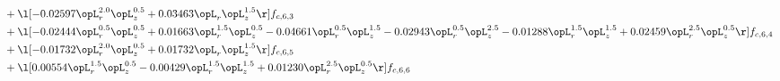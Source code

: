 \begin{alignat}{2}
& + \l[  -0.02597 \opL_r^{2.0} \opL_z^{0.5} +  0.03463 \opL_r \opL_z^{1.5}  \r] f_{c,6,3} \nonumber \\ 
& + \l[  -0.02444 \opL_r^{0.5} \opL_z^{0.5} +  0.01663 \opL_r^{1.5} \opL_z^{0.5}   -0.04661 \opL_r^{0.5} \opL_z^{1.5}   -0.02943 \opL_r^{0.5} \opL_z^{2.5}   -0.01288 \opL_r^{1.5} \opL_z^{1.5} +  0.02459 \opL_r^{2.5} \opL_z^{0.5}  \r] f_{c,6,4} \nonumber \\ 
& + \l[  -0.01732 \opL_r^{2.0} \opL_z^{0.5} +  0.01732 \opL_r \opL_z^{1.5}  \r] f_{c,6,5} \nonumber \\ 
& + \l[  0.00554 \opL_r^{1.5} \opL_z^{0.5}   -0.00429 \opL_r^{1.5} \opL_z^{1.5} +  0.01230 \opL_r^{2.5} \opL_z^{0.5}  \r] f_{c,6,6} \nonumber \\ 
\end{alignat} 


